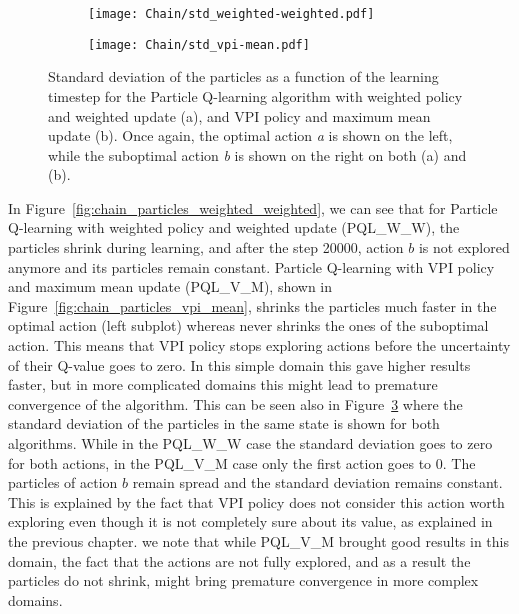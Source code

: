 \begin{figure}
\centering
\begin{subfigure}{\linewidth}
  \centering
  \texttt{[image: Chain/std\_weighted-weighted.pdf]}
  \label{fig:chain_std_weighted_weighted}
  \caption{}
\end{subfigure}

\bigskip
\centering
\begin{subfigure}{\linewidth}
  \centering
  \texttt{[image: Chain/std\_vpi-mean.pdf]}
  \label{fig:chain_std_vpi_mean}
  \caption{}
\end{subfigure}
\caption{Standard deviation of the particles as a function of the learning timestep for the Particle Q-learning algorithm with weighted policy and weighted update (a), and VPI policy and maximum mean update (b). Once again, the optimal action \emph{a} is shown on the left, while the suboptimal action \emph{b} is shown on the right on both (a) and (b).}
\label{fig:chain_std_evolution}
\end{figure}
In Figure~\ref{fig:chain_particles_weighted_weighted}, we can see that for Particle Q-learning with weighted policy and weighted update (PQL\_W\_W), the particles shrink during learning, and after the step 20000, action $b$ is not explored anymore and its particles remain constant. Particle Q-learning with VPI policy and maximum mean update (PQL\_V\_M), shown in Figure~\ref{fig:chain_particles_vpi_mean}, shrinks the particles much faster in the optimal action (left subplot) whereas never shrinks the ones of the suboptimal action. This means that VPI policy stops exploring actions before the uncertainty of their Q-value goes to zero. In this simple domain this gave higher results faster, but in more complicated domains this might lead to premature convergence of the algorithm. This can be seen also in Figure~\ref{fig:chain_std_evolution} where the standard deviation of the particles in the same state is shown for both algorithms. While in the PQL\_W\_W case the standard deviation goes to zero for both actions, in the PQL\_V\_M case only the first action goes to 0. The particles of action $b$ remain spread and the standard deviation remains constant. This is explained by the fact that VPI policy does not consider this action worth exploring even though it is not completely sure about its value, as explained in the previous chapter. we note that while PQL\_V\_M brought good results in this domain, the fact that the actions are not fully explored, and as a result the particles do not shrink, might bring premature convergence in more complex domains.\par
